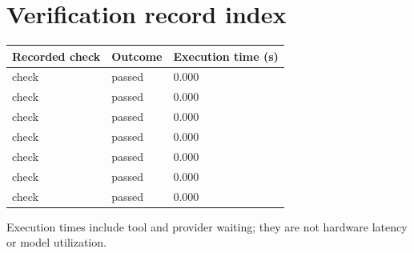 \documentclass[11pt,a4paper]{article}
\begin{document}
\section{Verification record index}

{\small\renewcommand{\arraystretch}{1.18}\begin{longtable}{@{}L{0.57\textwidth}|L{0.16\textwidth}|L{0.17\textwidth}@{}}\toprule

\textbf{Recorded check} & \textbf{Outcome} & \textbf{Execution time (\allowbreak{}s)\allowbreak{}}\\\midrule\endhead

check & passed & 0.000\\[2pt]\hline

check & passed & 0.000\\[2pt]\hline

check & passed & 0.000\\[2pt]\hline

check & passed & 0.000\\[2pt]\hline

check & passed & 0.000\\[2pt]\hline

check & passed & 0.000\\[2pt]\hline

check & passed & 0.000\\[2pt]\hline

\bottomrule\end{longtable}}

Execution times include tool and provider waiting; they are not hardware latency or model utilization.
\end{document}
